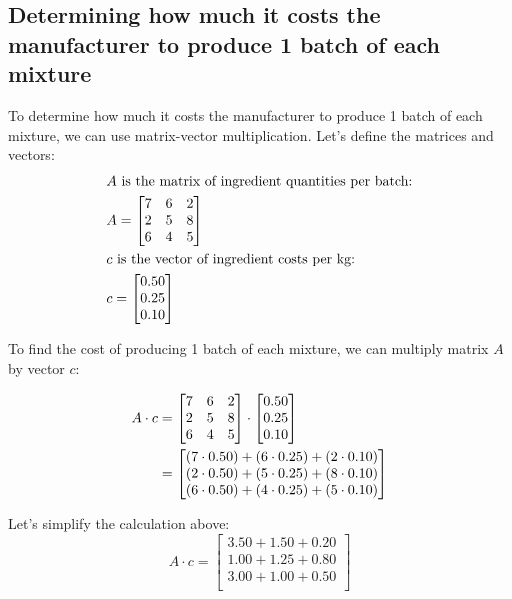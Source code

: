 \documentclass{article}
\begin{document}
\subsection*{Determining how much it costs the manufacturer to produce 1 batch of each mixture}
To determine how much it costs the manufacturer to produce 1 batch of each mixture, we can use matrix-vector multiplication. Let's define the matrices and vectors:
\begin{align}
& A \text{ is the matrix of ingredient quantities per batch:} \notag \\
& A = \begin{bmatrix}
7 & 6 & 2 \\
2 & 5 & 8 \\
6 & 4 & 5
\end{bmatrix} \notag \\
& c \text{ is the vector of ingredient costs per kg:} \notag \\
& c = \begin{bmatrix}
0.50 \\
0.25 \\
0.10
\end{bmatrix} \notag
\end{align}

To find the cost of producing 1 batch of each mixture, we can multiply matrix $A$ by vector $c$:

\begin{align}
A \cdot c & = \begin{bmatrix}
7 & 6 & 2 \\
2 & 5 & 8 \\
6 & 4 & 5
\end{bmatrix} \cdot \begin{bmatrix}
0.50 \\
0.25 \\
0.10
\end{bmatrix} \notag \\
& = \begin{bmatrix}
(7 \cdot 0.50) + (6 \cdot 0.25) + (2 \cdot 0.10) \\
(2 \cdot 0.50) + (5 \cdot 0.25) + (8 \cdot 0.10) \\
(6 \cdot 0.50) + (4 \cdot 0.25) + (5 \cdot 0.10)
\end{bmatrix} \notag
\end{align}

Let's simplify the calculation above:
\[
A \cdot c =
\begin{bmatrix}
3.50 + 1.50 + 0.20 \\
1.00 + 1.25 + 0.80 \\
3.00 + 1.00 + 0.50 \\
\end{bmatrix}
\]
\end{document}

